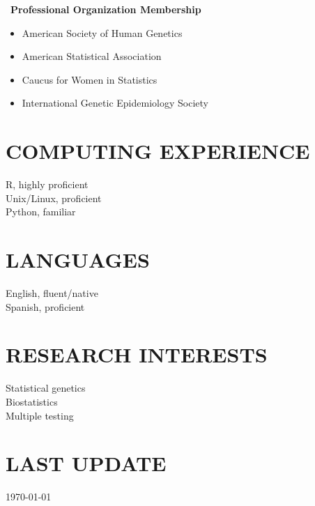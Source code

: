 \documentclass[margin]{res}
\begin{document}
\begin{resume}
	\ \textbf{Professional Organization Membership} 
	\begin{itemize}	 \itemsep -2pt
	\item American Society of Human Genetics 
	\item American Statistical Association
	\item Caucus for Women in Statistics
	\item International Genetic Epidemiology Society 
	\end{itemize}

\section{COMPUTING EXPERIENCE} R, highly proficient \\
							Unix/Linux, proficient \\
							Python, familiar \\
		

\section{LANGUAGES} English, fluent/native \\
					Spanish, proficient\\

\section{RESEARCH INTERESTS} Statistical genetics \\
							 Biostatistics \\
							 Multiple testing		\\
			
\section{LAST UPDATE} \today

\end{resume}
\end{document}
